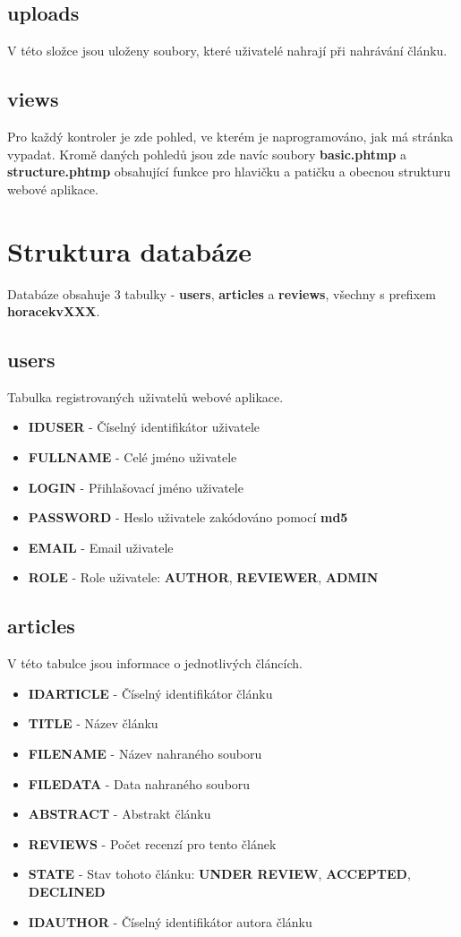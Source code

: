 \documentclass[czech,SP]{thesiskiv}
\begin{document}
\section{uploads}
\par
V této složce jsou uloženy soubory, které uživatelé nahrají při nahrávání článku.
\section{views}
\par
Pro každý kontroler je zde pohled, ve kterém je naprogramováno, jak má stránka vypadat. Kromě daných pohledů jsou zde navíc soubory
\textbf{basic.phtmp} a \textbf{structure.phtmp} obsahující funkce pro hlavičku a patičku a obecnou strukturu webové aplikace.

%
%
\chapter{Struktura databáze}
Databáze obsahuje 3 tabulky - \textbf{users}, \textbf{articles} a \textbf{reviews}, všechny s prefixem \textbf{horacekv\textunderscore XXX}.
\section{users}
Tabulka registrovaných uživatelů webové aplikace.
\begin{itemize}
\item \textbf{ID\textunderscore USER} - Číselný identifikátor uživatele
\item \textbf{FULL\textunderscore NAME} - Celé jméno uživatele
\item \textbf{LOGIN} - Přihlašovací jméno uživatele
\item \textbf{PASSWORD} - Heslo uživatele zakódováno pomocí \textbf{md5}
\item \textbf{EMAIL} - Email uživatele
\item \textbf{ROLE} - Role uživatele: \textbf{AUTHOR}, \textbf{REVIEWER}, \textbf{ADMIN}
\end{itemize}

\section{articles}
V této tabulce jsou informace o jednotlivých článcích.
\begin{itemize}
\item \textbf{ID\textunderscore ARTICLE} - Číselný identifikátor článku
\item \textbf{TITLE} - Název článku
\item \textbf{FILE\textunderscore NAME} - Název nahraného souboru
\item \textbf{FILE\textunderscore DATA} - Data nahraného souboru
\item \textbf{ABSTRACT} - Abstrakt článku
\item \textbf{REVIEWS} - Počet recenzí pro tento článek
\item \textbf{STATE} - Stav tohoto článku: \textbf{UNDER REVIEW}, \textbf{ACCEPTED}, \textbf{DECLINED}
\item \textbf{ID\textunderscore AUTHOR} - Číselný identifikátor autora článku
\end{itemize}
\end{document}
